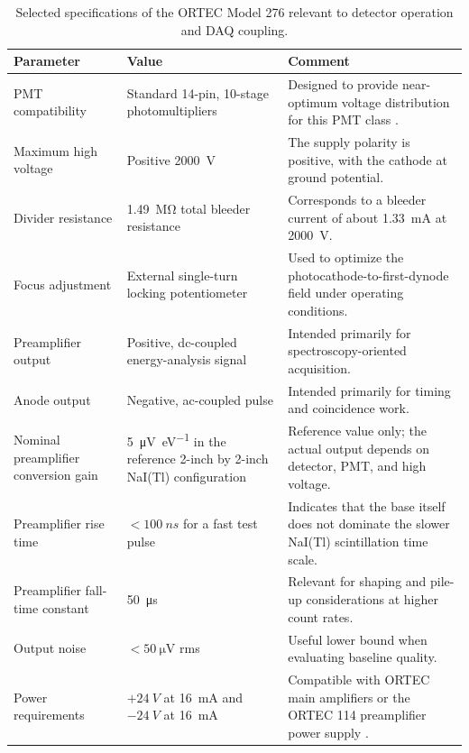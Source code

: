 \begin{table}[htbp]
\centering
\caption{Selected specifications of the ORTEC Model 276 relevant to detector operation and DAQ coupling.}
\label{tab:ortec276-specs}
\small
\setlength{\tabcolsep}{5pt}
\renewcommand{\arraystretch}{1.08}
\begin{tabularx}{\textwidth}{>{\raggedright\arraybackslash}p{4.2cm}YY}
\toprule
Parameter & Value & Comment \\
\midrule
PMT compatibility & Standard 14-pin, 10-stage photomultipliers & Designed to provide near-optimum voltage distribution for this PMT class \citep{ORTEC276Manual}. \\
Maximum high voltage & Positive \SI{2000}{V} & The supply polarity is positive, with the cathode at ground potential. \\
Divider resistance & \SI{1.49}{\mega\ohm} total bleeder resistance & Corresponds to a bleeder current of about \SI{1.33}{mA} at \SI{2000}{V}. \\
Focus adjustment & External single-turn locking potentiometer & Used to optimize the photocathode-to-first-dynode field under operating conditions. \\
Preamplifier output & Positive, dc-coupled energy-analysis signal & Intended primarily for spectroscopy-oriented acquisition. \\
Anode output & Negative, ac-coupled pulse & Intended primarily for timing and coincidence work. \\
Nominal preamplifier conversion gain & \SI{5}{\micro\volt\per\electronvolt} in the reference 2-inch by 2-inch NaI(Tl) configuration & Reference value only; the actual output depends on detector, PMT, and high voltage. \\
Preamplifier rise time & $<\SI{100}{ns}$ for a fast test pulse & Indicates that the base itself does not dominate the slower NaI(Tl) scintillation time scale. \\
Preamplifier fall-time constant & \SI{50}{\micro\second} & Relevant for shaping and pile-up considerations at higher count rates. \\
Output noise & $<\SI{50}{\micro\volt}$ rms & Useful lower bound when evaluating baseline quality. \\
Power requirements & $+\SI{24}{V}$ at \SI{16}{mA} and $-\SI{24}{V}$ at \SI{16}{mA} & Compatible with ORTEC main amplifiers or the ORTEC 114 preamplifier power supply \citep{ORTEC276Manual}. \\
\bottomrule
\end{tabularx}
\end{table}


